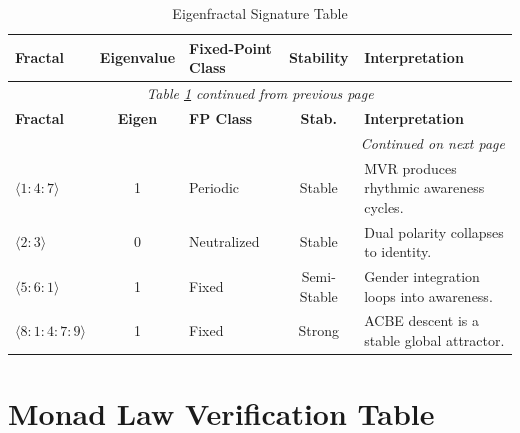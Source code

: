 \renewcommand{\arraystretch}{1.25}
\small
\begin{longtable}{p{2.5cm}|c|p{2cm}|c|p{5cm}}
\caption{Eigenfractal Signature Table}
\label{tab:eigenfractal-signature} \\
\toprule
\textbf{Fractal}
& \textbf{Eigenvalue}
& \textbf{Fixed-Point Class}
& \textbf{Stability}
& \textbf{Interpretation}
\\
\midrule
\endfirsthead
\multicolumn{5}{c}{\textit{Table \ref{tab:eigenfractal-signature} continued from previous page}} \\
\toprule
\textbf{Fractal}
& \textbf{Eigen}
& \textbf{FP Class}
& \textbf{Stab.}
& \textbf{Interpretation}
\\
\midrule
\endhead
\midrule
\multicolumn{5}{r}{\textit{Continued on next page}} \\
\endfoot
\bottomrule
\endlastfoot

$\langle 1:4:7\rangle$ & 1 & Periodic & Stable &
MVR produces rhythmic awareness cycles. \\

$\langle 2:3\rangle$ & 0 & Neutralized & Stable &
Dual polarity collapses to identity. \\

$\langle 5:6:1\rangle$ & 1 & Fixed & Semi-Stable &
Gender integration loops into awareness. \\

$\langle 8:1:4:7:9\rangle$ & 1 & Fixed & Strong &
ACBE descent is a stable global attractor. \\

\end{longtable}
\normalsize

\section{Monad Law Verification Table}

